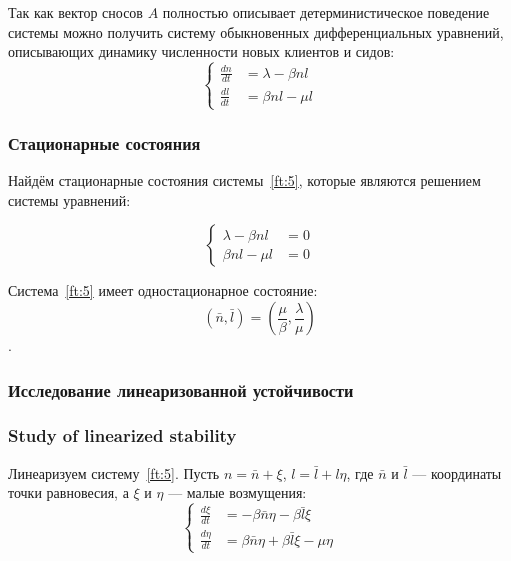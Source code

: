 \documentclass[floatfix,
showkeys,
twocolumn, nofootinbib, superscriptaddress, ]{revtex4-1}
\begin{document}
  Так как вектор сносов $A$ полностью описывает детерминистическое
  поведение системы можно получить систему обыкновенных
  дифференциальных уравнений, описывающих динамику численности новых
  клиентов и сидов:
\begin{equation}
  \label{ft:5} 
  \left \{
    \begin{aligned}
      \frac{dn}{d t}&=     \lambda - \beta n l\\
      \frac{dl}{d t}&= \beta n l - \mu l
    \end{aligned}
  \right.
\end{equation}


  \subsubsection{Стационарные состояния}

  Найдём стационарные состояния системы~\eqref{ft:5}, которые
  являются решением системы уравнений:

\begin{equation} 
  \label{ft:6} 
  \left \{
    \begin{aligned}
      \lambda - \beta n l &=0\\
      \beta n l - \mu l &=0
    \end{aligned}
  \right.
\end{equation}

  Система~\eqref{ft:5} имеет одностационарное состояние:
\begin{equation}
(\bar{n},\bar{l})= \left ( \frac{\mu }{\beta }, \frac{\lambda }{\mu }
\right )
\end{equation}.

  \subsubsection{Исследование линеаризованной устойчивости}
  \subsubsection{Study of linearized stability}

  Линеаризуем систему~\eqref{ft:5}. Пусть $n=\bar{n} + \xi $,
  $l=\bar{l} + l\eta$, где $\bar{n}$ и $\bar{l}$ --- координаты точки
  равновесия, а $\xi $ и $\eta $ --- малые возмущения:
\begin{equation}
  \label{ft:7} 
  \left\{
    \begin{aligned}
      \frac{d\xi }{d t}&=-\beta \bar{n} \eta- \beta \bar{l} \xi \\
      \frac{d\eta }{d t}&=\beta \bar{n} \eta + \beta \bar{l} \xi - \mu
      \eta
    \end{aligned}
  \right.
\end{equation}
\end{document}
